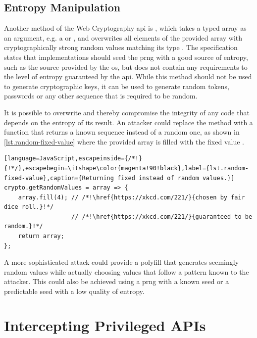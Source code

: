 \subsection{Entropy Manipulation}
\label{sec.threats.entropy}

Another method of the Web Cryptography \acs{api} is , which takes a typed array as an argument, e.g. a  or , and overwrites all elements of the provided array with cryptographically strong random values matching its type \cite{crypto}. The specification states that implementations should seed the \ac{prng} with a good source of entropy, such as the source provided by the \ac{os}, but does not contain any requirements to the level of entropy guaranteed by the \acs{api}. While this method should not be used to generate cryptographic keys, it can be used to generate random tokens, passwords or any other sequence that is required to be random.

It is possible to overwrite  and thereby compromise the integrity of any code that depends on the entropy of its result. An attacker could replace the method with a function that returns a known sequence instead of a random one, as shown in \autoref{lst.random-fixed-value} where the provided array is filled with the fixed value .

\begin{lstlisting}[language=JavaScript,escapeinside={/*!}{!*/},escapebegin=\itshape\color{magenta!90!black},label={lst.random-fixed-value},caption={Returning fixed instead of random values.}]
crypto.getRandomValues = array => {
    array.fill(4); // /*!\href{https://xkcd.com/221/}{chosen by fair dice roll.}!*/
                   // /*!\href{https://xkcd.com/221/}{guaranteed to be random.}!*/
    return array;
};
\end{lstlisting}

A more sophisticated attack could provide a polyfill that generates seemingly random values while actually choosing values that follow a pattern known to the attacker. This could also be achieved using a \ac{prng} with a known seed or a predictable seed with a low quality of entropy.



\section{Intercepting Privileged APIs}
\label{sec.threats.intercept-privileged}

